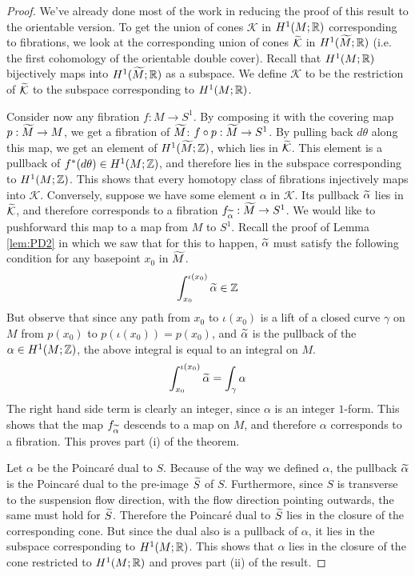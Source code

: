 \begin{proof}
  We've already done most of the work in reducing the proof of this result to the orientable
  version. To get the union of cones $\mathcal{K}$ in $H^1(M; \mathbb{R})$ corresponding to fibrations, we
  look at the corresponding union of cones $\widetilde{\mathcal{K}}$ in $H^1(\widetilde{M}; \mathbb{R})$ (i.e. the first
  cohomology of the orientable double cover). Recall that $H^1(M; \mathbb{R})$ bijectively maps into
  $H^1(\widetilde{M}; \mathbb{R})$ as a subspace. We define $\mathcal{K}$ to be the restriction of
  $\widetilde{\mathcal{K}}$ to the subspace corresponding to $H^1(M; \mathbb{R})$.

  Consider now any fibration $f: M \to S^1$. By composing it with the covering map
  $p: \widetilde{M} \to M$, we get a fibration of $\widetilde{M}$: $f \circ p: \widetilde{M} \to S^1$. By pulling back
  $d\theta$ along this map, we get an element of $H^1(\widetilde{M}; \mathbb{Z})$, which lies in
  $\widetilde{\mathcal{K}}$. This element is a pullback of $f^{\ast}(d\theta) \in H^1(M; \mathbb{Z})$, and
  therefore lies in the subspace corresponding to $H^1(M; \mathbb{Z})$. This shows that every homotopy
  class of fibrations injectively maps into $\mathcal{K}$. Conversely, suppose we have some
  element $\alpha$ in $\mathcal{K}$. Its pullback $\widetilde{\alpha}$ lies in $\widetilde{\mathcal{K}}$,
  and therefore corresponds to a fibration $f_{\widetilde{\alpha}}: \widetilde{M} \to S^1$. We would like
  to pushforward this map to a map from $M$ to $S^1$. Recall the proof of Lemma \ref{lem:PD2}
  in which we saw that for this to happen, $\widetilde{\alpha}$ must satisfy the following condition
  for any basepoint $x_0$ in $\widetilde{M}$.
  \begin{align*}
    \int_{x_0}^{\iota(x_0)} \widetilde{\alpha} \in \mathbb{Z}
  \end{align*}
  But observe that since any path from $x_0$ to $\iota(x_0)$ is a lift of a closed curve $\gamma$
  on $M$ from $p(x_0)$ to $p(\iota(x_0)) = p(x_0)$, and $\widetilde{\alpha}$ is the pullback of
  the $\alpha \in H^1(M; \mathbb{Z})$, the above integral is equal to an integral on $M$.
  \begin{align*}
    \int_{x_0}^{\iota(x_0)} \widetilde{\alpha} = \int_{\gamma} \alpha
  \end{align*}
  The right hand side term is clearly an integer, since $\alpha$ is an integer $1$-form. This
  shows that the map $f_{\widetilde{\alpha}}$ descends to a map on $M$, and therefore $\alpha$ corresponds
  to a fibration. This proves part (i) of the theorem.

  Let $\alpha$ be the Poincar\'e dual to $S$. Because of the way we defined $\alpha$, the pullback
  $\widetilde{\alpha}$ is the Poincar\'e dual to the pre-image $\widetilde{S}$ of $S$. Furthermore, since $S$ is
  transverse to the suspension flow direction, with the flow direction pointing outwards, the same
  must hold for $\widetilde{S}$. Therefore the Poincar\'e dual to $\widetilde{S}$ lies in the closure of the
  corresponding cone. But since the dual also is a pullback of $\alpha$, it lies in the subspace
  corresponding to $H^1(M; \mathbb{R})$. This shows that $\alpha$ lies in the closure of the cone
  restricted to $H^1(M; \mathbb{R})$ and proves part (ii) of the result.
\end{proof}

